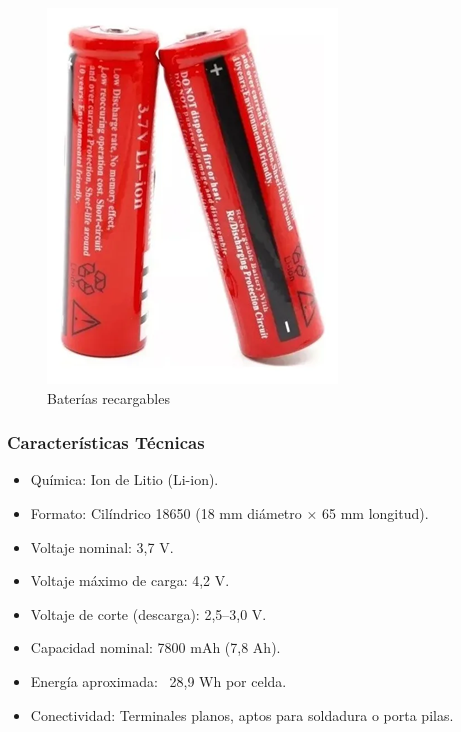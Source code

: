 \documentclass[12pt,a4paper]{article}
\begin{document}
\begin{figure}[H]
    \centering
    \includegraphics[width=0.5\linewidth]{Carpeta tecnica/Imagen5.png}
    \caption{Baterías recargables}
    \label{fig:placeholder}
\end{figure}

\subsubsection{Características Técnicas}

\begin{itemize}
\item Química: Ion de Litio (Li-ion).

\item Formato: Cilíndrico 18650 (18 mm diámetro × 65 mm longitud).

\item Voltaje nominal: 3,7 V.

\item Voltaje máximo de carga: 4,2 V.

\item Voltaje de corte (descarga): 2,5–3,0 V.

\item Capacidad nominal: 7800 mAh (7,8 Ah).

\item Energía aproximada: ~28,9 Wh por celda.

\item Conectividad: Terminales planos, aptos para soldadura o porta pilas.
\end{itemize}
\end{document}
